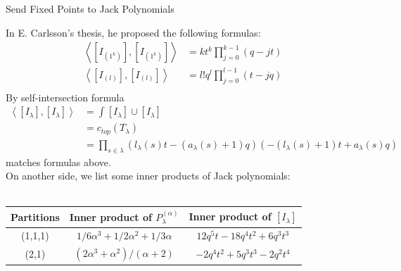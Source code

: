 \documentclass{article}
\newcommand{\inprod}[1]{\left<{#1}\right>}
\begin{document}
\begin{subsection}{Send Fixed Points to Jack Polynomials}

In E. Carlsson's thesis, he proposed the following formulas:
\[
\begin{aligned}
\inprod{[I_{(1^k)}],[I_{(1^k)}]} &= kt^k\prod^{k-1}_{j=0}(q-jt)\\
\inprod{[I_{(l)}],[I_{(l)}]} &= l!q^l\prod_{j=0}^{l-1}(t-jq)\\
\end{aligned}
\]
By self-intersection formula
\[
\begin{aligned}
\inprod{[I_\lambda],[I_\lambda]} &= \int [I_\lambda]\cup[I_\lambda]\\
&= c_{top}(T_\lambda)\\
&= \prod_{s\in \lambda}(l_\lambda(s)t - (a_{\lambda}(s)+1)q)(-(l_\lambda(s)+1)t + a_\lambda(s)q)
\end{aligned}
\]
matches formulas above.\\

\iffalse
On another side, we list some inner products of Jack polynomials:\\
\\

\begin{tabular}{|c|c|c|}
  \hline
  \textbf{Partitions} & \textbf{Inner product of $P_{\lambda}^{(\alpha)}$} & \textbf{Inner product of $[I_\lambda]$} \\
  \hline
  (1,1,1) & $1/6\alpha^3 + 1/2\alpha^2 + 1/3\alpha$ & $12q^5t - 18q^4t^2 + 6q^3t^3$ \\
  
  (2,1) & $(2\alpha^3 + \alpha^2)/(\alpha + 2)$ & $-2q^4t^2 + 5q^3t^3 - 2q^2t^4$ \\
  

\end{tabular}
\end{subsection}
\end{document}
